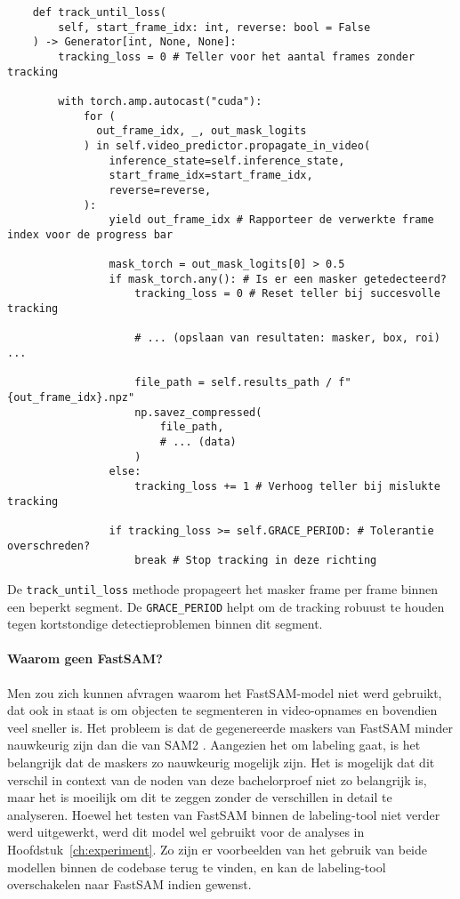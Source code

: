 \begin{listing}
  \begin{verbatim}
    def track_until_loss(
        self, start_frame_idx: int, reverse: bool = False
    ) -> Generator[int, None, None]:
        tracking_loss = 0 # Teller voor het aantal frames zonder tracking

        with torch.amp.autocast("cuda"):
            for (
              out_frame_idx, _, out_mask_logits
            ) in self.video_predictor.propagate_in_video(
                inference_state=self.inference_state,
                start_frame_idx=start_frame_idx,
                reverse=reverse,
            ):
                yield out_frame_idx # Rapporteer de verwerkte frame index voor de progress bar

                mask_torch = out_mask_logits[0] > 0.5
                if mask_torch.any(): # Is er een masker getedecteerd?
                    tracking_loss = 0 # Reset teller bij succesvolle tracking

                    # ... (opslaan van resultaten: masker, box, roi) ...

                    file_path = self.results_path / f"{out_frame_idx}.npz"
                    np.savez_compressed(
                        file_path,
                        # ... (data)
                    )
                else:
                    tracking_loss += 1 # Verhoog teller bij mislukte tracking

                if tracking_loss >= self.GRACE_PERIOD: # Tolerantie overschreden?
                    break # Stop tracking in deze richting

  \end{verbatim}
  \caption[Gelokaliseerde tracking met tolerantieperiode]{
    De \texttt{track\_until\_loss} methode propageert het masker frame per frame binnen een beperkt segment. 
    De \texttt{GRACE\_PERIOD} helpt om de tracking robuust te houden tegen kortstondige detectieproblemen binnen dit segment.
  }
\end{listing}

\paragraph{Waarom geen FastSAM?}

Men zou zich kunnen afvragen waarom het FastSAM-model niet werd gebruikt, dat ook in staat is om objecten te segmenteren in video-opnames en bovendien veel sneller is.
Het probleem is dat de gegenereerde maskers van FastSAM minder nauwkeurig zijn dan die van SAM2 \autocite{Zhao2023}. 
Aangezien het om labeling gaat, is het belangrijk dat de maskers zo nauwkeurig mogelijk zijn.
Het is mogelijk dat dit verschil in context van de noden van deze bachelorproef niet zo belangrijk is, maar het is moeilijk om dit te zeggen zonder de verschillen in detail te analyseren.
Hoewel het testen van FastSAM binnen de labeling-tool niet verder werd uitgewerkt, werd dit model wel gebruikt voor de analyses in Hoofdstuk~\ref{ch:experiment}.
Zo zijn er voorbeelden van het gebruik van beide modellen binnen de codebase terug te vinden, en kan de labeling-tool overschakelen naar FastSAM indien gewenst.

